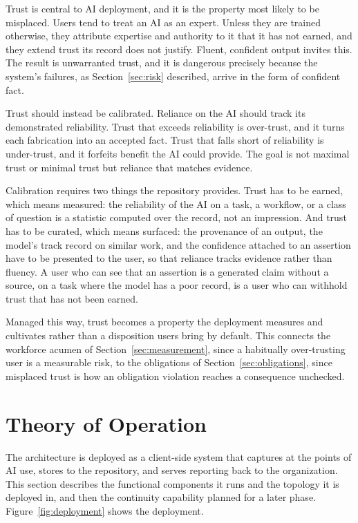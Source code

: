 \documentclass[11pt]{article}
\begin{document}
Trust is central to AI deployment, and it is the property most likely to be
misplaced. Users tend to treat an AI as an expert. Unless they are trained
otherwise, they attribute expertise and authority to it that it has not earned,
and they extend trust its record does not justify. Fluent, confident output
invites this. The result is unwarranted trust, and it is dangerous precisely
because the system's failures, as Section~\ref{sec:risk} described, arrive in the
form of confident fact.

Trust should instead be calibrated. Reliance on the AI should track its
demonstrated reliability. Trust that exceeds reliability is over-trust, and it
turns each fabrication into an accepted fact. Trust that falls short of
reliability is under-trust, and it forfeits benefit the AI could provide. The
goal is not maximal trust or minimal trust but reliance that matches evidence.

Calibration requires two things the repository provides. Trust has to be earned,
which means measured: the reliability of the AI on a task, a workflow, or a class
of question is a statistic computed over the record, not an impression. And trust
has to be curated, which means surfaced: the provenance of an output, the model's
track record on similar work, and the confidence attached to an assertion have to
be presented to the user, so that reliance tracks evidence rather than fluency. A
user who can see that an assertion is a generated claim without a source, on a
task where the model has a poor record, is a user who can withhold trust that has
not been earned.

Managed this way, trust becomes a property the deployment measures and cultivates
rather than a disposition users bring by default. This connects the workforce
acumen of Section~\ref{sec:measurement}, since a habitually over-trusting user is
a measurable risk, to the obligations of Section~\ref{sec:obligations}, since
misplaced trust is how an obligation violation reaches a consequence unchecked.

\section{Theory of Operation}
\label{sec:operation}

The architecture is deployed as a client-side system that captures at the points
of AI use, stores to the repository, and serves reporting back to the
organization. This section describes the functional components it runs and the
topology it is deployed in, and then the continuity capability planned for a later
phase. Figure~\ref{fig:deployment} shows the deployment.
\end{document}
